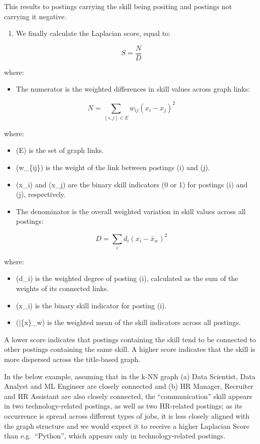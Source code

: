 \documentclass[
  letterpaper,
  DIV=11,
  numbers=noendperiod,
  sfdefaults=false]{scrartcl}
\providecommand{\tightlist}{%
  \setlength{\itemsep}{0pt}\setlength{\parskip}{0pt}}
\begin{document}
This results to postings carrying the skill being positing and postings
not carrying it negative.

\begin{enumerate}
\def\labelenumi{(\alph{enumi})}
\setcounter{enumi}{3}
\tightlist
\item
  We finally calculate the Laplacian score, equal to:
\end{enumerate}

\[
S = \frac{N}{D}
\]

where:

\begin{itemize}
\tightlist
\item
  The numerator is the weighted differences in skill values across graph
  links:
\end{itemize}

\[
N = \sum_{(i,j)\in E} w_{ij}(x_i-x_j)^2
\]

where:

\begin{itemize}
\item
  (E) is the set of graph links.
\item
  (w\_\{ij\}) is the weight of the link between postings (i) and (j).
\item
  (x\_i) and (x\_j) are the binary skill indicators (0 or 1) for
  postings (i) and (j), respectively.
\item
  The denominator is the overall weighted variation in skill values
  across all postings:
\end{itemize}

\[
D = \sum_i d_i(x_i-\bar{x}_w)^2
\]

where:

\begin{itemize}
\tightlist
\item
  (d\_i) is the weighted degree of posting (i), calculated as the sum of
  the weights of its connected links.
\item
  (x\_i) is the binary skill indicator for posting (i).
\item
  (\bar\{x\}\_w) is the weighted mean of the skill indicators across all
  postings.
\end{itemize}

A lower score indicates that postings containing the skill tend to be
connected to other postings containing the same skill. A higher score
indicates that the skill is more dispersed across the title-based graph.

In the below example, assuming that in the k-NN graph (a) Data
Scientist, Data Analyst and ML Engineer are closely connected and (b) HR
Manager, Recruiter and HR Assistant are also closely connected, the
``communication'' skill appears in two technology-related postings, as
well as two HR-related postings; as its occurrence is spread across
different types of jobs, it is less closely aligned with the graph
structure and we would expect it to receive a higher Laplacian Score
than e.g.~``Python'', which appears only in technology-related postings.
\end{document}
